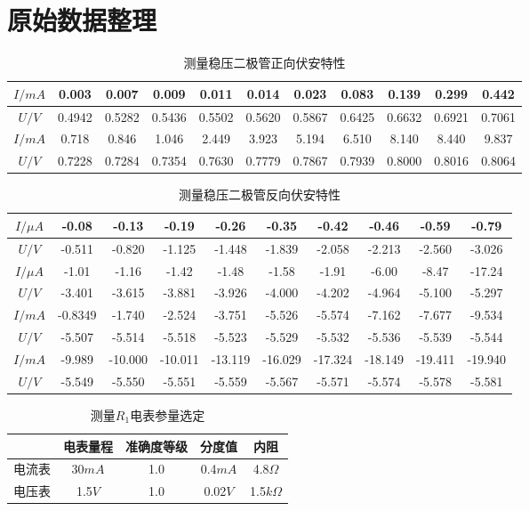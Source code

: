 \documentclass[a4 paper,12pt]{article}
\begin{document}
\section{原始数据整理}
\begin{table}[H]
	\caption{测量稳压二极管正向伏安特性}
	\label{测量稳压二极管正向伏安特性}
	\centering
	\begin{tabular}{*{11}{c}}
		\toprule[0.5mm]
		$I/mA$&0.003&0.007&0.009&0.011&0.014&0.023&0.083&0.139&0.299&0.442\\
		\midrule
		$U/V$&0.4942&0.5282&0.5436&0.5502&0.5620&0.5867&0.6425&0.6632&0.6921&0.7061\\
		\bottomrule[0.5mm]
		$I/mA$&0.718&0.846&1.046&2.449&3.923&5.194&6.510&8.140&8.440&9.837\\
		\midrule
		$U/V$&0.7228&0.7284&0.7354&0.7630&0.7779&0.7867&0.7939&0.8000&0.8016&0.8064\\
		\bottomrule[0.5mm]
	\end{tabular}
\end{table}
\begin{table}[H]
	\caption{测量稳压二极管反向伏安特性}
	\label{测量稳压二极管反向伏安特性}
	\begin{tabular}{*{10}{c}}
		\toprule[0.5mm]
		$I/\mu A$&-0.08&-0.13&-0.19&-0.26&-0.35&-0.42&-0.46&-0.59&-0.79\\
		\midrule
		$U/V$&-0.511&-0.820&-1.125&-1.448&-1.839&-2.058&-2.213&-2.560&-3.026\\
		\bottomrule[0.5mm]
		$I/\mu A$&-1.01&-1.16&-1.42&-1.48&-1.58&-1.91&-6.00&-8.47&-17.24\\
		\midrule
		$U/V$&-3.401&-3.615&-3.881&-3.926&-4.000&-4.202&-4.964&-5.100&-5.297\\
		\bottomrule[0.5mm]
		$I/mA$&-0.8349&-1.740&-2.524&-3.751&-5.526&-5.574&-7.162&-7.677&-9.534\\
		\midrule
		$U/V$&-5.507&-5.514&-5.518&-5.523&-5.529&-5.532&-5.536&-5.539&-5.544\\
		\bottomrule[0.5mm]
		$I/mA$&-9.989&-10.000&-10.011&-13.119&-16.029&-17.324&-18.149&-19.411&-19.940\\
		\midrule
		$U/V$&-5.549&-5.550&-5.551&-5.559&-5.567&-5.571&-5.574&-5.578&-5.581\\
		\toprule[0.5mm]
	\end{tabular}
\end{table}
\begin{table}[H]
	\caption{测量$R_{1}$电表参量选定}
	\label{测量$R_{1}$电表参量选定}
	\centering
	\begin{tabular}{c|cccc}
		\toprule
		&电表量程&准确度等级&分度值&内阻\\
		\hline
		电流表&30$mA$&1.0&0.4$mA$&4.8$\Omega$\\
		电压表&1.5$V$&1.0&0.02$V$&1.5$k\Omega$\\
		\toprule
	\end{tabular}
\end{table}
\end{document}
